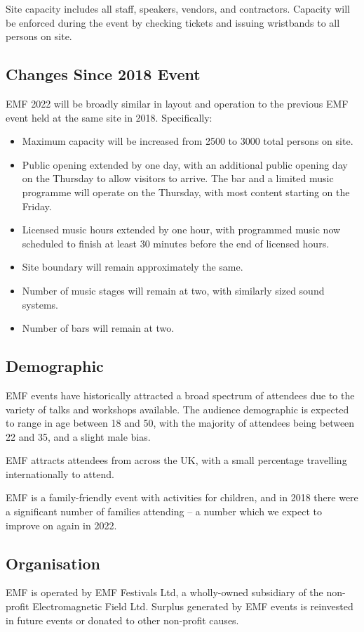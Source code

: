 Site capacity includes all staff, speakers, vendors, and contractors. Capacity will be enforced during the
event by checking tickets and issuing wristbands to all persons on site.

\subsection{Changes Since 2018 Event}

EMF 2022 will be broadly similar in layout and operation to the previous EMF event held at
the same site in 2018. Specifically:

\begin{itemize}
\tightlist
	\item Maximum capacity will be increased from 2500 to 3000 total persons on site.
	\item Public opening extended by one day, with an additional public opening day on
            the Thursday to allow visitors to arrive. The bar and a limited music programme
            will operate on the Thursday, with most content starting on the Friday.
	\item Licensed music hours extended by one hour, with programmed music now scheduled
            to finish at least 30 minutes before the end of licensed hours.
	\item Site boundary will remain approximately the same.
	\item Number of music stages will remain at two, with similarly sized sound systems.
	\item Number of bars will remain at two.
\end{itemize}

\subsection{Demographic}
EMF events have historically attracted a broad spectrum of attendees due to the
variety of talks and workshops available. The audience demographic is expected
to range in age between 18 and 50, with the majority of attendees being between
22 and 35, and a slight male bias.

EMF attracts attendees from across the UK, with a small percentage travelling
internationally to attend.

EMF is a family-friendly event with activities for children, and in 2018 there
were a significant number of families attending -- a number which we expect to
improve on again in 2022.

\subsection{Organisation}
EMF is operated by EMF Festivals Ltd, a wholly-owned subsidiary of the non-profit
Electromagnetic Field Ltd. Surplus generated by EMF events is reinvested in future
events or donated to other non-profit causes.

